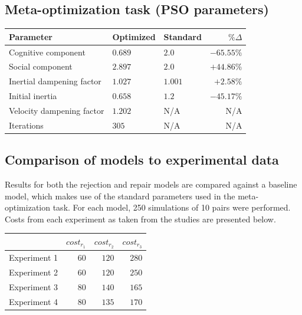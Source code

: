 \documentclass[12pt,a4paper]{article}
\begin{document}
\subsection{Meta-optimization task (PSO parameters)}
\begin{center}
    \begin{tabular}{ l l l r }
    Parameter & Optimized & Standard\footnotemark[1] & $\% \Delta$ \\ \hline
    Cognitive component       & $0.689$ & $2.0$   & $-65.55\%$ \\ \hline
    Social component          & $2.897$ & $2.0$   & $+44.86\%$ \\ \hline
    Inertial dampening factor & $1.027$ & $1.001$ & $+2.58\%$\\ \hline
    Initial inertia           & $0.658$ & $1.2$   & $-45.17\%$ \\ \hline
    Velocity dampening factor & $1.202$ & N/A     & N/A\\ \hline
    Iterations                & $305$   & N/A     & N/A\\ 
    \end{tabular}
\end{center}

\subsection{Comparison of models to experimental data}
Results for both the rejection and repair models are compared against a baseline model, which makes use of the standard parameters used in the meta-optimization task. For each model, 250 simulations of 10 pairs were performed. Costs from each experiment as taken from the \citeauthor{rohde2012} studies are presented below.
\begin{center}
    \begin{tabular}{ l r r r }
     & $cost_{r_1}$ & $cost_{r_2}$ & $cost_{r_3}$ \\ \hline
    Experiment 1 & $60$ & $120$ & $280$ \\ \hline
    Experiment 2 & $60$ & $120$ & $250$ \\ \hline
    Experiment 3 & $80$ & $140$ & $165$ \\ \hline
    Experiment 4 & $80$ & $135$ & $170$ \\ 
    \end{tabular}
\end{center}
\end{document}
